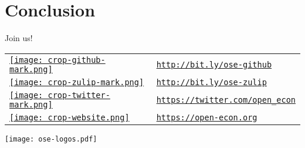 \section{Conclusion}

\begin{frame}{Join us!}
\begin{multicols}{2}

	\begin{table}[]
		\begin{tabularx}{1\textwidth}{>{\centering\arraybackslash}m{1.5cm} >{\centering\arraybackslash}m{3.7cm}}
			\href{http://bit.ly/ose-github}{\texttt{[image: crop-github-mark.png]}} &
			\href{http://bit.ly/ose-github}{\texttt{http://bit.ly/ose-github}} \\[1cm]

			\href{http://bit.ly/ose-zulip}{\texttt{[image: crop-zulip-mark.png]}} &
			\href{http://bit.ly/ose-zulip}{\texttt{http://bit.ly/ose-zulip}}    \\[0.8cm]

			\href{https://twitter.com/open_econ}{\texttt{[image: crop-twitter-mark.png]}} &
			\href{https://twitter.com/open_econ}{\texttt{https://twitter.com/open\_econ}} \\[0.8cm]

			\href{https://open-econ.org}{\texttt{[image: crop-website.png]}} & \href{https://open-econ.org}{\texttt{https://open-econ.org}}
		\end{tabularx}
	\end{table}

	\columnbreak

	\hspace{2.5cm}\texttt{[image: ose-logos.pdf]}

\end{multicols}
\end{frame}
